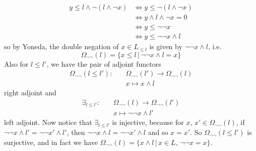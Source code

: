 \documentclass{article}
\begin{document}
\begin{align*}
    y\leq l\land \neg(l\land\neg x) & \iff y\leq \neg(l\land\neg x)\\
    & \iff y\land l \land \neg x=0\\
    & \iff y\leq\neg\neg x\\
    & \iff y\leq\neg\neg x\land l
\end{align*}
so by Yoneda, the double negation of $x\in L_{\leq l}$ is given by $\neg\neg x\land l$, i.e. $$\Omega_{\neg\neg}(l)=\{x\leq l\,|\,\neg\neg x\land l=x\}$$
Also for $l\leq l'$, we have the pair of adjoint functors 
\begin{align*}
    \Omega_{\neg\neg}(l\leq l'): & \quad\Omega_{\neg\neg}(l')  \xrightarrow{} \Omega_{\neg\neg}(l)\\
    & \quad x  \mapsto  x\land l
\end{align*}
right adjoint and 
\begin{align*}
    \exists_{l\leq l'}:&\quad\Omega_{\neg\neg}(l)\xrightarrow{}\Omega_{\neg\neg}(l')\\
    &\quad x\mapsto \neg\neg x\land l'
\end{align*}
left adjoint. Now notice that $\exists_{l\leq l'}$ is injective, because for $x,\,x'\in \Omega_{\neg\neg}(l)$, if $\neg\neg x\land l'=\neg\neg x'\land l'$, then $\neg\neg x\land l=\neg\neg x'\land l$ and so $x=x'$. So $\Omega_{\neg\neg}(l\leq l')$ is surjective, and in fact we have $\Omega_{\neg\neg}(l)=\{x\land l\,|\,x\in L,\,\neg\neg x=x\}$.
\end{document}

